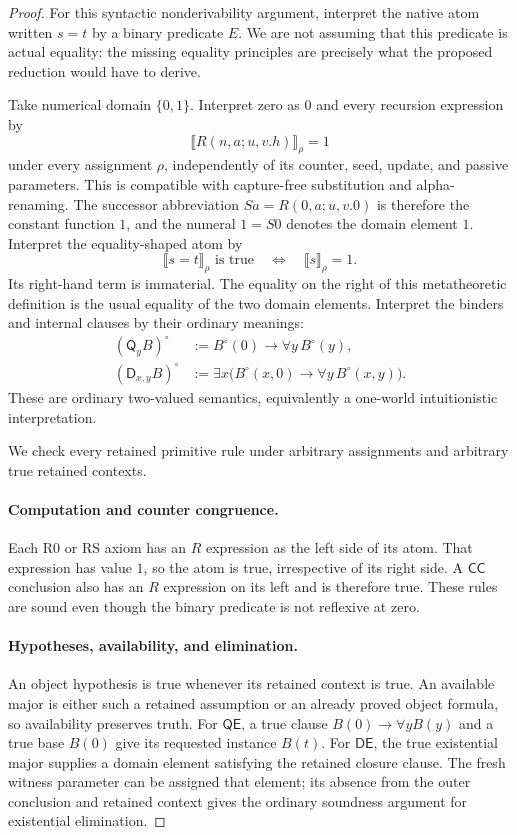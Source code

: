 \begin{proof}
For this syntactic nonderivability argument, interpret the native atom
written $s=t$ by a binary predicate $E$. We are not assuming that this
predicate is actual equality: the missing equality principles are
precisely what the proposed reduction would have to derive.

Take numerical domain $\{0,1\}$. Interpret zero as $0$ and every
recursion expression by
\[
       \llbracket R(n,a;u,v.h)\rrbracket_\rho=1
\]
under every assignment $\rho$, independently of its counter, seed,
update, and passive parameters. This is compatible with capture-free
substitution and alpha-renaming. The successor abbreviation
$Sa=R(0,a;u,v.0)$ is therefore the constant function $1$, and the
numeral $1=S0$ denotes the domain element $1$.
Interpret the equality-shaped atom by
\[
       \llbracket s=t\rrbracket_\rho\text{ is true}
       \quad\Longleftrightarrow\quad
       \llbracket s\rrbracket_\rho=1.
 \tag{Predicate interpretation}
\]
Its right-hand term is immaterial. The equality on the right of this
metatheoretic definition is the usual equality of the two domain elements.
Interpret the binders and internal clauses by their ordinary meanings:
\[
 \begin{aligned}
  (\mathsf Q_y B)^\circ
    &:=B^\circ(0)\to\forall y\,B^\circ(y),\\
  (\mathsf D_{x,y}B)^\circ
    &:=\exists x\bigl(B^\circ(x,0)\to\forall y\,B^\circ(x,y)\bigr).
 \end{aligned}
\]
These are ordinary two-valued semantics, equivalently a one-world
intuitionistic interpretation.

We check every retained primitive rule under arbitrary assignments and
arbitrary true retained contexts.

\paragraph{Computation and counter congruence.}
Each R0 or RS axiom has an $R$ expression as the left side of its atom.
That expression has value $1$, so the atom is true, irrespective of its
right side. A $\mathsf{CC}$ conclusion also has an $R$ expression on
its left and is therefore true. These rules are sound even though the
binary predicate is not reflexive at zero.

\paragraph{Hypotheses, availability, and elimination.}
An object hypothesis is true whenever its retained context is true.
An available major is either such a retained assumption or an already
proved object formula, so availability preserves truth.
For $\mathsf{QE}$, a true clause
$B(0)\to\forall yB(y)$ and a true base $B(0)$ give its requested
instance $B(t)$. For $\mathsf{DE}$, the true existential major supplies
a domain element satisfying the retained closure clause. The fresh
witness parameter can be assigned that element; its absence from the
outer conclusion and retained context gives the ordinary soundness
argument for existential elimination.


\end{proof}

